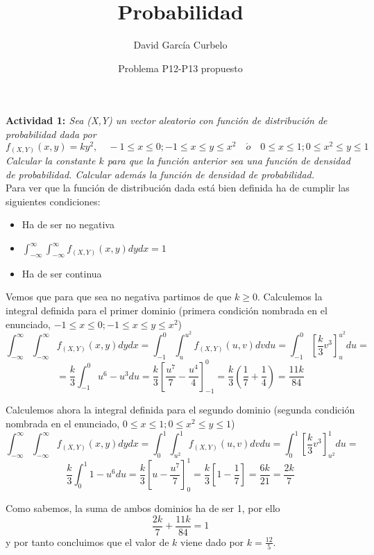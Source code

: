 \documentclass[a4paper, 12pt]{article}
\author{David García Curbelo}
\title{Probabilidad}
\date{Problema P12-P13 propuesto}
\begin{document}
    \maketitle
    \setcounter{page}{1}
    \pagestyle{plain}

    {\bf{Actividad 1: }}{\textit{Sea (X,Y) un vector aleatorio con función de distribución de probabilidad dada por 
    $$f_{(X,Y)}(x,y)=ky^2, \quad -1 \leq x \leq 0; -1\leq x\leq y\leq x^2 \quad \acute{o} \quad 0\leq x\leq 1;0\leq x^2 \leq y\leq 1$$
    Calcular la constante $k$ para que la función anterior sea una función de densidad de probabilidad. Calcular además 
    la función de densidad de probabilidad.}}\\

    Para ver que la función de distribución dada está bien definida ha de cumplir las siguientes condiciones:
    \begin{itemize}
        \item Ha de ser no negativa
        \item $\int _{-\infty}^\infty \int _{-\infty}^\infty f_{(X,Y)}(x,y) dydx = 1$
        \item Ha de ser continua
    \end{itemize}

    Vemos que para que sea no negativa partimos de que $k\geq 0$. Calculemos la integral definida para el primer dominio
    (primera condición nombrada en el enunciado, $-1 \leq x \leq 0; -1\leq x\leq y\leq x^2$)
    $$\int _{-\infty}^\infty \int _{-\infty}^\infty f_{(X,Y)}(x,y) dydx = \int _{-1}^0 \int _{u}^{u^2} f_{(X,Y)}(u,v) dvdu = 
    \int _{-1}^0 \left[\frac{k}{3}v^3\right]_{u}^{u^2} du = $$
    $$ = \frac{k}{3} \int _{-1}^0 u^6 - u^3 du = \frac{k}{3} \left[\frac{u^7}{7} - \frac{u^4}{4}\right]_{-1}^0 =
    \frac{k}{3} \left(\frac{1}{7} + \frac{1}{4}\right) = \frac{11k}{84}$$ 
    
    Calculemos ahora la integral definida para el segundo dominio
    (segunda condición nombrada en el enunciado, $0\leq x\leq 1;0\leq x^2 \leq y\leq 1$)
    $$\int _{-\infty}^\infty \int _{-\infty}^\infty f_{(X,Y)}(x,y) dydx = \int _{0}^1 \int _{u^2}^{1} f_{(X,Y)}(u,v) dvdu = 
    \int _{0}^1 \left[\frac{k}{3}v^3\right]_{u^2}^{1} du = $$
    $$ \frac{k}{3} \int _{0}^1 1-u^6 du = \frac{k}{3} \left[u-\frac{u^7}{7}\right]_{0}^1 = \frac{k}{3} \left[1-\frac{1}{7}\right] =
    \frac{6k}{21}=\frac{2k}{7}$$

    Como sabemos, la suma de ambos dominios ha de ser 1, por ello
    $$\frac{2k}{7}+\frac{11k}{84}=1$$
    y por tanto concluimos que el valor de $k$ viene dado por $k=\frac{12}{5}$.\\ \\ 
\end{document}
